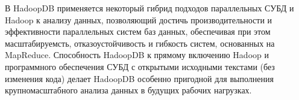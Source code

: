 В HadoopDB применяется некоторый гибрид подходов параллельных СУБД и Hadoop к анализу данных, позволяющий достичь производительности 
и эффективности параллельных систем баз данных, обеспечивая при этом масштабируемсть, отказоустойчивость и гибкость систем, 
основанных на MapReduce. Способность HadoopDB к прямому включению Hadoop и программного обеспечения СУБД с открытыми исходными 
текстами (без изменения кода) делает HadoopDB особенно пригодной для выполнения крупномасштабного анализа данных в будущих 
рабочих нагрузках.